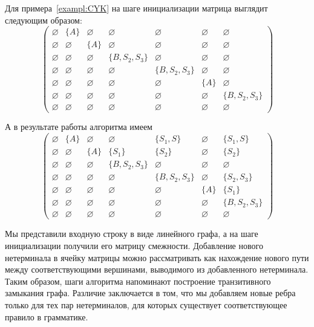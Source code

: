 Для примера~\ref{exampl:CYK} на шаге инициализации матрица выглядит следующим образом:
\[
    \begin{pmatrix}
        \varnothing & \{A\}       & \varnothing & \varnothing     & \varnothing     & \varnothing & \varnothing     \\
        \varnothing & \varnothing & \{A\}       & \varnothing     & \varnothing     & \varnothing & \varnothing     \\
        \varnothing & \varnothing & \varnothing & \{B, S_2, S_3\} & \varnothing     & \varnothing & \varnothing     \\
        \varnothing & \varnothing & \varnothing & \varnothing     & \{B, S_2, S_3\} & \varnothing & \varnothing     \\
        \varnothing & \varnothing & \varnothing & \varnothing     & \varnothing     & \{A\}       & \varnothing     \\
        \varnothing & \varnothing & \varnothing & \varnothing     & \varnothing     & \varnothing & \{B, S_2, S_3\} \\
        \varnothing & \varnothing & \varnothing & \varnothing     & \varnothing     & \varnothing & \varnothing
    \end{pmatrix}
\]

А в результате работы алгоритма имеем
\[
    \begin{pmatrix}
        \varnothing & \{A\}       & \varnothing & \varnothing     & \{S_1, S\}      & \varnothing & \{S_1, S\}      \\
        \varnothing & \varnothing & \{A\}       & \{S_1\}         & \{S_2\}         & \varnothing & \{S_2\}         \\
        \varnothing & \varnothing & \varnothing & \{B, S_2, S_3\} & \varnothing     & \varnothing & \varnothing     \\
        \varnothing & \varnothing & \varnothing & \varnothing     & \{B, S_2, S_3\} & \varnothing & \{S_2, S_3\}    \\
        \varnothing & \varnothing & \varnothing & \varnothing     & \varnothing     & \{A\}       & \{S_1\}         \\
        \varnothing & \varnothing & \varnothing & \varnothing     & \varnothing     & \varnothing & \{B, S_2, S_3\} \\
        \varnothing & \varnothing & \varnothing & \varnothing     & \varnothing     & \varnothing & \varnothing
    \end{pmatrix}
\]

Мы представили входную строку в виде линейного графа, а на шаге инициализации получили его матрицу смежности.
Добавление нового нетерминала в ячейку матрицы можно рассматривать как нахождение нового пути между соответствующими вершинами, выводимого из добавленного нетерминала.
Таким образом, шаги алгоритма напоминают построение транзитивного замыкания графа.
Различие заключается в том, что мы добавляем новые ребра только для тех пар нетерминалов, для которых существует соответствующее правило в грамматике.

